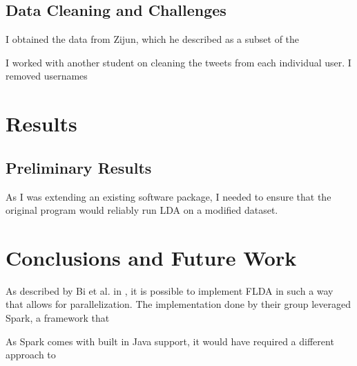 \documentclass[a4paper]{article}
\begin{document}
\begin{multicols}{2}
\subsection{Data Cleaning and Challenges}
I obtained the data from Zijun, which he described as a subset of the 

I worked with another student on cleaning the tweets from each individual user. I removed usernames 


\section{Results}
\label{sec:results}
\subsection{Preliminary Results}
As I was extending an existing software package, I needed to ensure that the original program would reliably run LDA on a modified dataset.



\section{Conclusions and Future Work}
\label{sec:conc}

As described by Bi et al. in \cite{flda}, it is possible to implement FLDA in such a way that allows for parallelization. The implementation done by their group leveraged Spark, a framework that 

As Spark comes with built in Java support, it would have required a different approach to 


\end{multicols}
\end{document}
